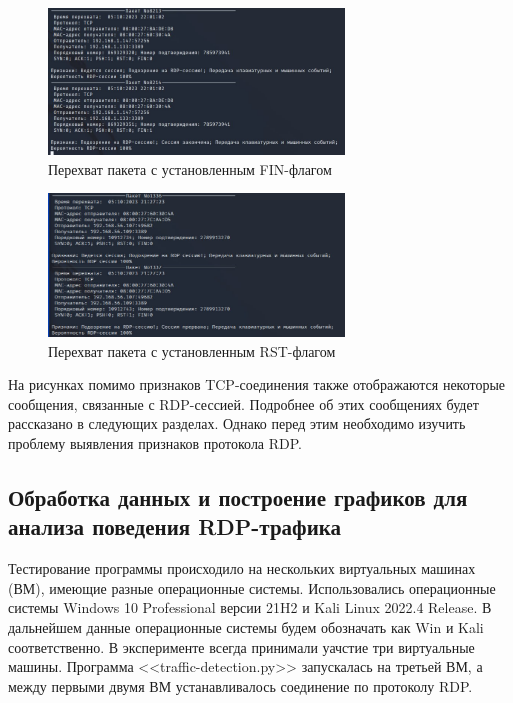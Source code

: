 \documentclass[bachelor, och, coursework]{SCWorks}
\begin{document}
\begin{figure}[H]
  \centering
  \includegraphics[width=0.7\textwidth]{photo/ses-fin.jpg}
  \caption{Перехват пакета с установленным FIN-флагом}
  \label{ses-fin}
\end{figure}


\begin{figure}[H]
  \centering
  \includegraphics[width=0.7\textwidth]{photo/ses-rst.jpg}
  \caption{Перехват пакета с установленным RST-флагом}
  \label{ses-rst}
\end{figure}

На рисунках помимо признаков TCP-соединения также отображаются некоторые сообщения, связанные с RDP-сессией. 
Подробнее об этих сообщениях будет рассказано в следующих разделах. Однако перед этим необходимо изучить 
проблему выявления признаков протокола RDP.

\subsection{Обработка данных и построение графиков для анализа поведения RDP-трафика}

Тестирование программы происходило на нескольких виртуальных машинах (ВМ), имеющие разные операционные системы.
Использовались операционные системы Windows 10 Professional версии 21H2 и Kali Linux 2022.4 Release. В дальнейшем данные 
операционные системы будем обозначать как Win и Kali соответственно. В эксперименте всегда принимали уачстие три виртуальные машины.
Программа <<traffic-detection.py>> запускалась на третьей ВМ, а между первыми двумя ВМ устанавливалось соединение по протоколу RDP.
\end{document}
